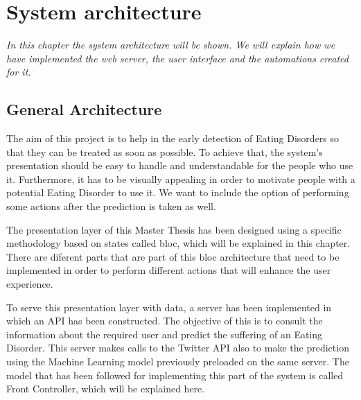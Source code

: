\chapter{System architecture}
\label{chap:architecture}

\textit{In this chapter the system architecture will be shown. We will explain how we have implemented the web server, the user interface and the automations created for it.}

\clearpage

\section{General Architecture}


The aim of this project is to help in the early detection of Eating Disorders so that they can be treated as soon as possible. To achieve that, the system's presentation should be easy to handle and understandable for the people who use it. Furthermore, it has to be visually appealing in order to motivate people with a potential Eating Disorder to use it. We want to include the option of performing some actions after the prediction is taken as well.

The presentation layer of this Master Thesis has been designed using a specific methodology based on states called bloc, which will be explained in this chapter. There are diferent parts that are part of this bloc architecture that need to be implemented in order to perform different actions that will enhance the user experience.

To serve this presentation layer with data, a server has been implemented in which an API has been constructed. The objective of this is to consult the information about the required user and predict the suffering of an Eating Disorder. This server makes calls to the Twitter API also to make the prediction using the Machine Learning model previously preloaded on the same server. The model that has been followed for implementing this part of the system is called Front Controller, which will be explained here.

